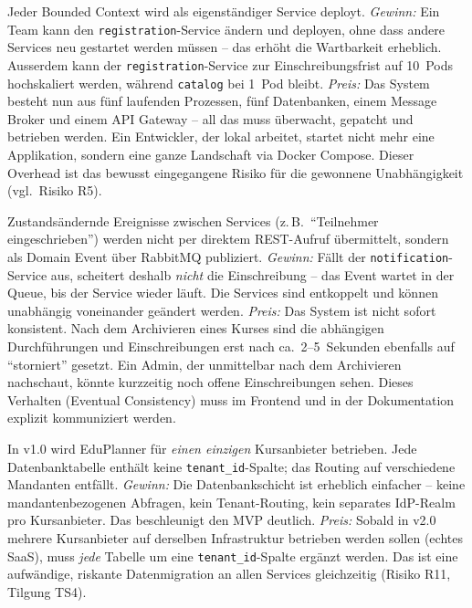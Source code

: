 \begin{description}[leftmargin=0pt, style=nextline]

  \item[Microservices (ADR-001):
    $\uparrow$~Maintainability,\;$\uparrow$~Scalability,\;$\downarrow$~Betriebskomplexität]
  Jeder Bounded Context wird als eigenständiger Service deployt.
  \textit{Gewinn:} Ein Team kann den \texttt{registration}-Service ändern und deployen,
  ohne dass andere Services neu gestartet werden müssen -- das erhöht die
  Wartbarkeit erheblich. Ausserdem kann der \texttt{registration}-Service zur
  Einschreibungsfrist auf 10~Pods hochskaliert werden, während
  \texttt{catalog} bei 1~Pod bleibt.
  \textit{Preis:} Das System besteht nun aus fünf laufenden Prozessen, fünf
  Datenbanken, einem Message Broker und einem API Gateway -- all das muss
  überwacht, gepatcht und betrieben werden. Ein Entwickler, der lokal arbeitet,
  startet nicht mehr eine Applikation, sondern eine ganze Landschaft via Docker
  Compose. Dieser Overhead ist das bewusst eingegangene Risiko für die
  gewonnene Unabhängigkeit (vgl.\ Risiko R5).

  \item[Asynchrones Messaging (ADR-002):
    $\uparrow$~Availability,\;$\uparrow$~Maintainability,\;$\downarrow$~Eventual Consistency]
  Zustandsändernde Ereignisse zwischen Services (z.\,B.\ ``Teilnehmer eingeschrieben'')
  werden nicht per direktem REST-Aufruf übermittelt, sondern als Domain Event über
  RabbitMQ publiziert.
  \textit{Gewinn:} Fällt der \texttt{notification}-Service aus, scheitert
  deshalb \emph{nicht} die Einschreibung -- das Event wartet in der Queue,
  bis der Service wieder läuft. Die Services sind entkoppelt und können
  unabhängig voneinander geändert werden.
  \textit{Preis:} Das System ist nicht sofort konsistent. Nach dem Archivieren
  eines Kurses sind die abhängigen Durchführungen und Einschreibungen erst nach
  ca.\ 2--5~Sekunden ebenfalls auf ``storniert'' gesetzt. Ein Admin, der
  unmittelbar nach dem Archivieren nachschaut, könnte kurzzeitig noch offene
  Einschreibungen sehen. Dieses Verhalten (Eventual Consistency) muss im
  Frontend und in der Dokumentation explizit kommuniziert werden.

  \item[Single-Tenant v1.0 (ADR-008):
    $\uparrow$~Maintainability kurzfristig,\;$\downarrow$~Technische Schulden v2.0]
  In v1.0 wird EduPlanner für \emph{einen einzigen} Kursanbieter betrieben.
  Jede Datenbanktabelle enthält keine \texttt{tenant\_id}-Spalte; das Routing
  auf verschiedene Mandanten entfällt.
  \textit{Gewinn:} Die Datenbankschicht ist erheblich einfacher -- keine
  mandantenbezogenen Abfragen, kein Tenant-Routing, kein separates
  IdP-Realm pro Kursanbieter. Das beschleunigt den MVP deutlich.
  \textit{Preis:} Sobald in v2.0 mehrere Kursanbieter auf derselben
  Infrastruktur betrieben werden sollen (echtes SaaS), muss \emph{jede}
  Tabelle um eine \texttt{tenant\_id}-Spalte ergänzt werden. Das ist eine
  aufwändige, riskante Datenmigration an allen Services gleichzeitig
  (Risiko R11, Tilgung TS4).


\end{description}
